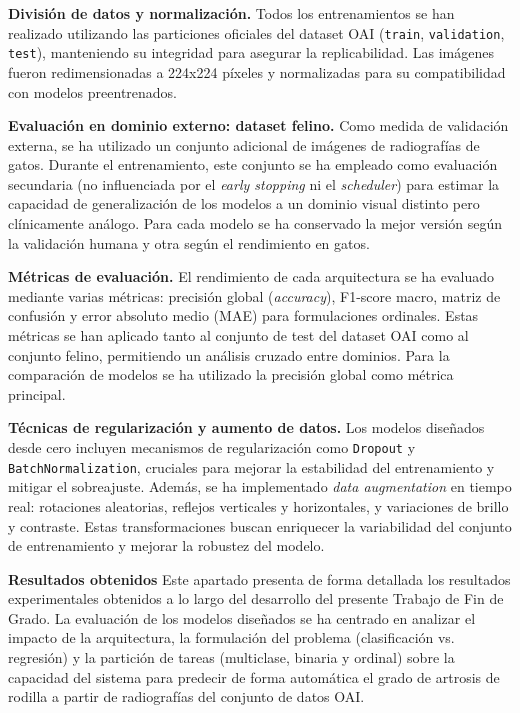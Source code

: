 \documentclass[11pt,spanish,listoffigures,listoftables]{tfgetsinf}
\begin{document}
\textbf{División de datos y normalización.}
Todos los entrenamientos se han realizado utilizando las particiones oficiales del dataset OAI (\texttt{train}, \texttt{validation}, \texttt{test}), 
manteniendo su integridad para asegurar la replicabilidad. Las imágenes fueron redimensionadas a 224x224 píxeles y normalizadas para su compatibilidad 
con modelos preentrenados.

\textbf{Evaluación en dominio externo: dataset felino.}
Como medida de validación externa, se ha utilizado un conjunto adicional de imágenes de radiografías de gatos. Durante el entrenamiento, este conjunto 
se ha empleado como evaluación secundaria (no influenciada por el \textit{early stopping} ni el \textit{scheduler}) para estimar la capacidad de generalización 
de los modelos a un dominio visual distinto pero clínicamente análogo. Para cada modelo se ha conservado la mejor versión según la validación humana 
y otra según el rendimiento en gatos.

\textbf{Métricas de evaluación.}
El rendimiento de cada arquitectura se ha evaluado mediante varias métricas: precisión global (\textit{accuracy}), F1-score macro, matriz de confusión 
y error absoluto medio (MAE) para formulaciones ordinales. Estas métricas se han aplicado tanto al conjunto de test del dataset OAI como al conjunto 
felino, permitiendo un análisis cruzado entre dominios. Para la comparación de modelos se ha utilizado la precisión global como métrica principal.

\textbf{Técnicas de regularización y aumento de datos.}
Los modelos diseñados desde cero incluyen mecanismos de regularización como \texttt{Dropout} y \texttt{BatchNormalization}, cruciales para mejorar la 
estabilidad del entrenamiento y mitigar el sobreajuste. Además, se ha implementado \textit{data augmentation} en tiempo real: rotaciones aleatorias, 
reflejos verticales y horizontales, y variaciones de brillo y contraste. Estas transformaciones buscan enriquecer la variabilidad del conjunto de entrenamiento 
y mejorar la robustez del modelo.

\textbf{Resultados obtenidos}
Este apartado presenta de forma detallada los resultados experimentales obtenidos a lo largo del desarrollo del presente Trabajo de Fin de Grado. La evaluación de los modelos diseñados se ha centrado en analizar el impacto de la arquitectura, la formulación del problema (clasificación vs. regresión) y la partición de tareas (multiclase, binaria y ordinal) sobre la capacidad del sistema para predecir de forma automática el grado de artrosis de rodilla a partir de radiografías del conjunto de datos OAI.
\end{document}
